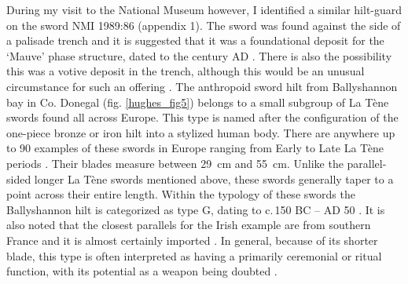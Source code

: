 During my visit to the National Museum however, I identified a similar hilt-guard on the sword NMI 1989:86 (appendix 1). 
The sword was found against the side of a palisade trench and it is suggested that it was a foundational deposit for the ‘Mauve’ phase structure, 
dated to the  century AD \parencite[89]{Johnston2007}.
There is also the possibility this was a votive deposit in the trench, although this would be an unusual circumstance for such an offering \parencite[89]{Johnston2007}.
The anthropoid sword hilt from Ballyshannon bay in Co. Donegal (fig. \ref{hughes_fig5}) belongs to a small subgroup of La Tène swords found all across Europe. 
This type is named after the configuration of the one-piece bronze or iron hilt into a stylized human body. 
There are anywhere up to 90 examples of these swords in Europe ranging from Early to Late La Tène periods \parencite[193]{OBrien2009}. 
Their blades measure between \SI{29}{\cm} and \SI{55}{\cm}. 
Unlike the parallel-sided longer La Tène swords mentioned above, these swords generally taper to a point across their entire length. 
Within the typology of these swords the Ballyshannon hilt is categorized as type G, dating to c.\,150 BC – AD 50 \parencite[193]{OBrien2009}. 
It is also noted that the closest parallels for the Irish example are from southern France and it is almost certainly imported 
\parencites[193]{OBrien2009}[143]{Raftery1994}[25]{CahillWilson2014}. 
In general, because of its shorter blade, this type is often interpreted as having a primarily ceremonial or ritual function, 
with its potential as a weapon being doubted \parencites[69]{Pleiner1993}[160]{Lejars2007}.

